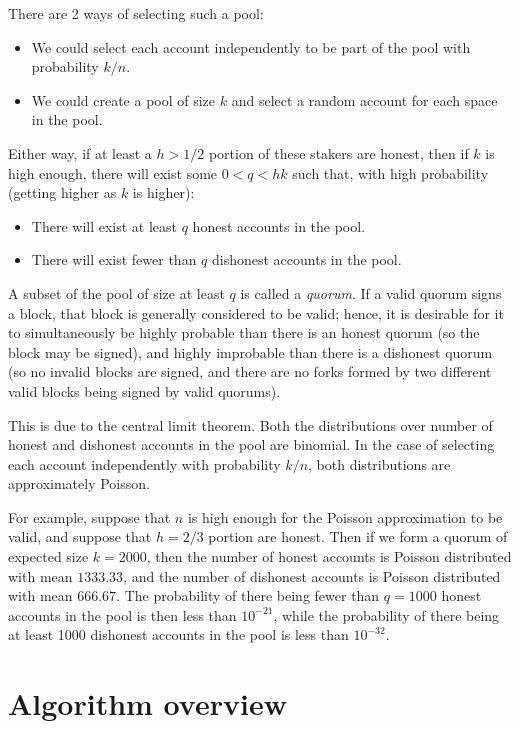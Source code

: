 \documentclass{article}
\begin{document}
There are 2 ways of selecting such a pool:

\begin{itemize}
  \item We could select each account independently to be part of the pool with probability $k/n$.
  \item We could create a pool of size $k$ and select a random account for each space in the pool.
\end{itemize}

Either way, if at least a  $h > 1/2$ portion of these stakers are honest, then if $k$ is high enough, there will exist some $0 < q < hk$ such that, with high probability (getting higher as $k$ is higher):

\begin{itemize}
  \item There will exist at least $q$ honest accounts in the pool.
  \item There will exist fewer than $q$ dishonest accounts in the pool.
\end{itemize}

A subset of the pool of size at least $q$ is called a \textit{quorum}.  If a valid quorum signs a block, that block is generally considered to be valid;
hence, it is desirable for it to simultaneously be highly probable than there is an honest quorum (so the block may be signed), and highly improbable
than there is a dishonest quorum (so no invalid blocks are signed, and there are no forks formed by two different valid blocks being signed by valid quorums).

This is due to the central limit theorem.  Both the distributions over number of honest and dishonest accounts in the pool are binomial.
In the case of selecting each account independently with probability $k/n$, both distributions are approximately Poisson.

For example, suppose that $n$ is high enough for the Poisson approximation to be valid, and suppose that $h = 2/3$ portion are honest.
Then if we form a quorum of expected size $k = 2000$, then the number of honest accounts is Poisson distributed with mean $1333.33$,
and the number of dishonest accounts is Poisson distributed with mean $666.67$.
The probability of there being fewer than $q = 1000$ honest accounts in the pool is then less than $10^{-21}$, while the probability of 
there being at least 1000 dishonest accounts in the pool is less than $10^{-32}$.

\section{Algorithm overview}
\end{document}
